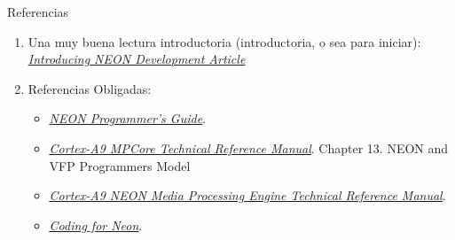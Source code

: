 \begin{frame}[t,plain]{Referencias}
\begin{enumerate}
 \item  Una muy buena lectura introductoria (introductoria, o sea para iniciar):
\href{https://developer.arm.com/documentation/dht0002/a}{\textit{\color{blue}\underline{Introducing NEON Development Article}}}

 \vspace {0.8cm}
\item   Referencias Obligadas:

\begin{itemize}
 \item \href{https://developer.arm.com/documentation/den0018/a}{\textit{\color{blue}\underline{NEON Programmer's Guide}}}.

 \item \href{https://documentation-service.arm.com/static/5e8e108088295d1e18d347a5?token=}{\textit{\color{blue}\underline{Cortex-A9 MPCore Technical Reference Manual}}}. Chapter 13. NEON and VFP Programmers Model

 \item \href{https://documentation-service.arm.com/static/5f037ec4dbdee951c1cd73cd?token=}{\textit{\color{blue}\underline{Cortex-A9 NEON Media Processing Engine Technical Reference Manual}}}.

 \item \href{https://developer.arm.com/-/media/Arm\%20Developer\%20Community/PDF/Neon\%20Programmers\%20Guide/102159_0104_01_CodingForNeon.pdf?revision=a3235e10-ded9-4ac8-a415-badcafdd56a6}{\textit{\color{blue}\underline{Coding for Neon}}}.
\end{itemize}

\end{enumerate}

 

 
 



\end{frame}
